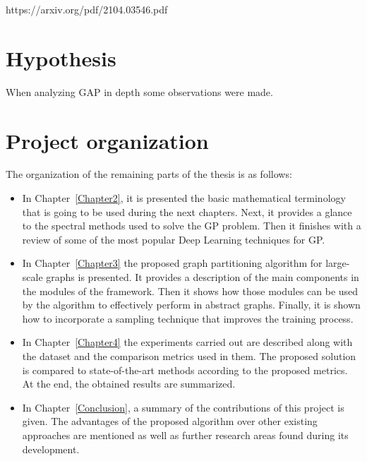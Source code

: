 https://arxiv.org/pdf/2104.03546.pdf
\section{Hypothesis}
When analyzing GAP in depth some observations were made.

\section{Project organization}

The organization of the remaining parts of the thesis is as follows:
\begin{itemize}
    \item In Chapter~\ref{Chapter2}, it is presented the basic mathematical terminology that is going to be used during the next chapters. Next, it provides a glance to the spectral methods used to solve the GP problem. Then it finishes with a review of some of the most popular Deep Learning techniques for GP.
    
    \item In Chapter~\ref{Chapter3} the proposed graph partitioning algorithm for large-scale graphs is presented. It provides a description of the main components in the modules of the framework. Then it shows how those modules can be used by the algorithm to effectively perform in abstract graphs. Finally, it is shown how to incorporate a sampling technique that improves the training process.
    
    \item In Chapter~\ref{Chapter4} the experiments carried out are described along with the dataset and the comparison metrics used in them. The proposed solution is compared to state-of-the-art methods according to the proposed metrics. At the end, the obtained results are summarized.
    
    \item In Chapter~\ref{Conclusion}, a summary of the contributions of this project is given. The advantages of the proposed algorithm over other existing approaches are mentioned as well as further research areas found during its development.
\end{itemize}

